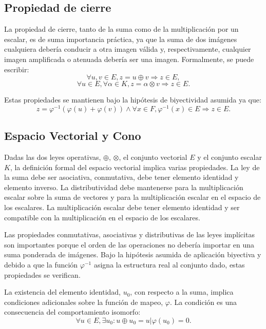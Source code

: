 \subsection{Propiedad de cierre}

La propiedad de cierre, tanto de la suma como de la multiplicación por un escalar, es de suma importancia práctica, ya que la suma de dos imágenes cualquiera debería conducir a otra imagen válida y, respectivamente, cualquier imagen amplificada o atenuada debería ser una imagen. Formalmente, se puede escribir:
\begin{equation}
	\forall u,v \in E, z = u \oplus v \Rightarrow z \in E,
\end{equation}
\begin{equation}
	\forall u \in E, \forall \alpha \in K, z=\alpha \otimes v \Rightarrow z \in E.
\end{equation}

Estas propiedades se mantienen bajo la hipótesis de biyectividad asumida ya que: 
\begin{equation}
	z=\varphi^{-1}(\varphi(u)+\varphi(v)) \land \forall x \in F, \varphi^{-1}(x) \in E \Rightarrow z \in E.
\end{equation}

\subsection{Espacio Vectorial y Cono}
Dadas las dos leyes operativas, $\oplus$, $\otimes$, el conjunto vectorial $E$ y el conjunto escalar $K$, la definición formal del espacio vectorial implica varias propiedades. La ley de la suma debe ser asociativa, conmutativa, debe tener elemento identidad y elemento inverso. La distributividad debe mantenerse para la multiplicación escalar sobre la suma de vectores y para la multiplicación escalar en el espacio de los escalares. La multiplicación escalar debe tener elemento identidad y ser compatible con la multiplicación en el espacio de los escalares.

Las propiedades conmutativas, asociativas y distributivas de las leyes implícitas son importantes porque el orden de las operaciones no debería importar en una suma ponderada de imágenes. Bajo la hipótesis asumida de aplicación biyectiva y debido a que la función $\varphi^{-1}$ asigna la estructura real al conjunto dado, estas propiedades se verifican.

La existencia del elemento identidad, $u_0$, con respecto a la suma, implica condiciones adicionales sobre la función de mapeo, $\varphi$. La condición es una consecuencia del comportamiento isomorfo:
\begin{equation}
	\forall u\in E, \exists u_0 : u \oplus u_0 = u | \varphi(u_0)=0.
\end{equation}

